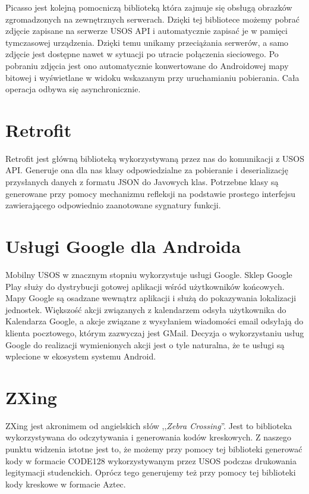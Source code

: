 \documentclass{pracamgr}
\begin{document}
Picasso jest kolejną pomocniczą biblioteką która zajmuje się obsługą obrazków
zgromadzonych na zewnętrznych serwerach. Dzięki tej bibliotece możemy pobrać
zdjęcie zapisane na serwerze USOS API i automatycznie zapisać je w pamięci
tymczasowej urządzenia. Dzięki temu unikamy przeciążania serwerów, a samo zdjęcie
jest dostępne nawet w sytuacji po utracie połączenia sieciowego. Po pobraniu zdjęcia
jest ono automatycznie konwertowane do Androidowej mapy bitowej i wyświetlane w
widoku wskazanym przy uruchamianiu pobierania. Cała operacja odbywa się asynchronicznie.

\section{Retrofit}

Retrofit jest główną biblioteką wykorzystywaną przez nas do komunikacji z
USOS API. Generuje ona dla nas klasy odpowiedzialne za pobieranie i deserializację
przysłanych danych z formatu JSON do Javowych klas. Potrzebne klasy są generowane
przy pomocy mechanizmu refleksji na podstawie prostego interfejsu zawierającego
odpowiednio zaanotowane sygnatury funkcji.

\section{Usługi Google dla Androida}

Mobilny USOS w znacznym stopniu wykorzystuje usługi Google. Sklep Google Play
służy do dystrybucji gotowej aplikacji wśród użytkowników końcowych. Mapy Google
są osadzane wewnątrz aplikacji i służą do pokazywania lokalizacji jednostek.
Większość akcji związanych z kalendarzem odsyła użytkownika do Kalendarza Google,
a akcje związane z wysyłaniem wiadomości email odsyłają do klienta pocztowego,
którym zazwyczaj jest GMail. Decyzja o wykorzystaniu usług Google do realizacji
wymienionych akcji jest o tyle naturalna, że te usługi są wplecione w ekosystem
systemu Android.

\section{ZXing}

ZXing jest akronimem od angielskich słów ,,\textit{Zebra Crossing}''. Jest to
biblioteka wykorzystywana do odczytywania i generowania kodów kreskowych. Z
naszego punktu widzenia istotne jest to, że możemy przy pomocy tej biblioteki
generować kody w formacie CODE128 wykorzystywanym przez USOS podczas drukowania
legitymacji studenckich. Oprócz tego generujemy też przy pomocy tej biblioteki
kody kreskowe w formacie Aztec.
\end{document}
